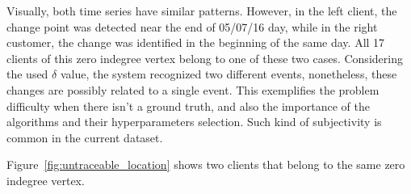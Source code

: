 Visually, both time series have similar patterns.
However, in the left client, the change point was detected near the end of
05/07/16 day, while in the right customer, the change was identified in the
beginning of the same day.
All 17 clients of this zero indegree vertex belong to one of these two cases.
Considering the used $\delta$ value, the system recognized two different
events, nonetheless, these changes are possibly related to a single event.
This exemplifies the problem difficulty when there isn't a ground truth,
and also the importance of the algorithms and their hyperparameters selection.
Such kind of subjectivity is common in the current dataset.

Figure~\ref{fig:untraceable_location} shows two clients that belong to the same
zero indegree vertex.

\begin{figure}[H]
    \centering
\end{figure}
